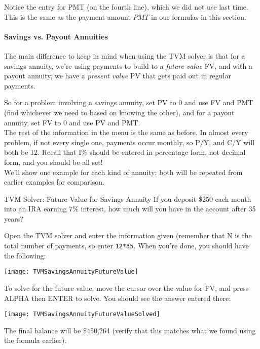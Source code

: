 Notice the entry for PMT (on the fourth line), which we did not use last time.  This is the same as the payment amount $PMT$ in our formulas in this section.

\paragraph{Savings vs. Payout Annuities} The main difference to keep in mind when using the TVM solver is that for a savings annuity, we're using payments to build to a \emph{future value} FV, and with a payout annuity, we have a \emph{present value} PV that gets paid out in regular payments.

So for a problem involving a savings annuity, set PV to 0 and use FV and PMT (find whichever we need to based on knowing the other), and for a payout annuity, set FV to 0 and use PV and PMT.\\

The rest of the information in the menu is the same as before.  In almost every problem, if not every single one, payments occur monthly, so P/Y, and C/Y will both be 12.  Recall that I\% should be entered in percentage form, not decimal form, and you should be all set!\\

We'll show one example for each kind of annuity; both will be repeated from earlier examples for comparison.

\begin{example}[https://www.youtube.com/watch?v=m9m20XU1v-U&list=PLfmpjsIzhztsZtnb7HnXrQ8SLoiOCIcAM&index=32]{TVM Solver: Future Value for Savings Annuity}
If you deposit \$250 each month into an IRA earning 7\% interest, how much will you have in the account after 35 years?

\sol
Open the TVM solver and enter the information given (remember that N is the total number of payments, so enter \texttt{12*35}.  When you're done, you should have the following:
\begin{center}
\texttt{[image: TVMSavingsAnnuityFutureValue]}
\end{center}
To solve for the future value, move the cursor over the value for FV, and press $\boxed{\textrm{ALPHA}}$ then $\boxed{\textrm{ENTER}}$ to solve.  You should see the answer entered there:
\begin{center}
\texttt{[image: TVMSavingsAnnuityFutureValueSolved]}
\end{center}
The final balance will be \$450,264 (verify that this matches what we found using the formula earlier).
\end{example}

